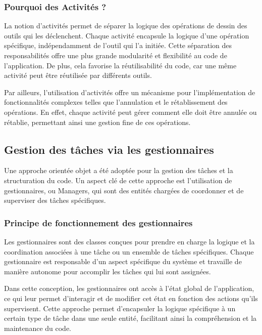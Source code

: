 \subsubsection{Pourquoi des Activités ?}

La notion d'activités permet de séparer la logique des opérations de dessin des outils qui les déclenchent. Chaque activité encapsule la logique d'une opération spécifique, indépendamment de l'outil qui l'a initiée. Cette séparation des responsabilités offre une plus grande modularité et flexibilité au code de l'application. De plus, cela favorise la réutilisabilité du code, car une même activité peut être réutilisée par différents outils.

Par ailleurs, l'utilisation d'activités offre un mécanisme pour l'implémentation de fonctionnalités complexes telles que l'annulation et le rétablissement des opérations. En effet, chaque activité peut gérer comment elle doit être annulée ou rétablie, permettant ainsi une gestion fine de ces opérations.

\subsection{Gestion des tâches via les gestionnaires}

Une approche orientée objet a été adoptée pour la gestion des tâches et la structuration du code. Un aspect clé de cette approche est l'utilisation de gestionnaires, ou \guillemotleft Managers\guillemotright, qui sont des entités chargées de coordonner et de superviser des tâches spécifiques.

\subsubsection{Principe de fonctionnement des gestionnaires}

Les gestionnaires sont des classes conçues pour prendre en charge la logique et la coordination associées à une tâche ou un ensemble de tâches spécifiques. Chaque gestionnaire est responsable d'un aspect spécifique du système et travaille de manière autonome pour accomplir les tâches qui lui sont assignées.

Dans cette conception, les gestionnaires ont accès à l'état global de l'application, ce qui leur permet d'interagir et de modifier cet état en fonction des actions qu'ils supervisent. Cette approche permet d'encapsuler la logique spécifique à un certain type de tâche dans une seule entité, facilitant ainsi la compréhension et la maintenance du code.

